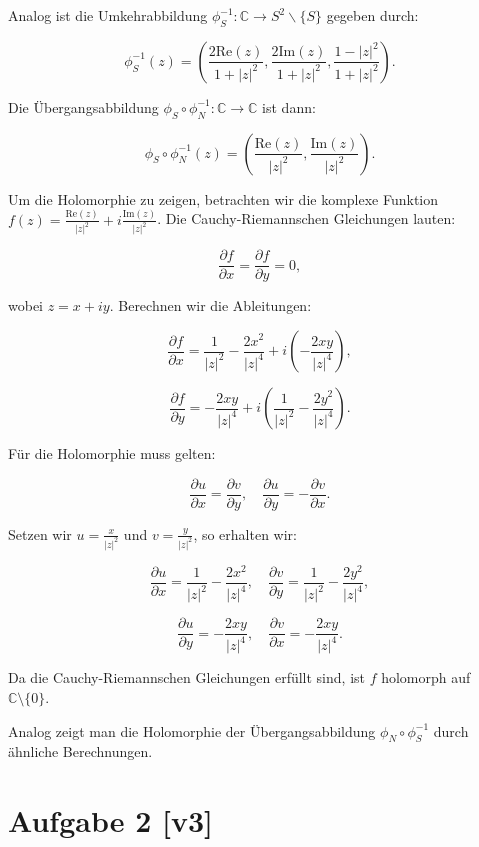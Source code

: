 \documentclass[11pt,a4paper]{article}
\begin{document}
Analog ist die Umkehrabbildung $\phi_S^{-1}: \mathbb{C} \to S^2 \backslash \{S\}$ gegeben durch:

\[
\phi_S^{-1}(z) = \left( \frac{2\text{Re}(z)}{1 + |z|^2}, \frac{2\text{Im}(z)}{1 + |z|^2}, \frac{1 - |z|^2}{1 + |z|^2} \right).
\]

Die Übergangsabbildung $\phi_S \circ \phi_N^{-1}: \mathbb{C} \to \mathbb{C}$ ist dann:

\[
\phi_S \circ \phi_N^{-1}(z) = \left( \frac{\text{Re}(z)}{|z|^2}, \frac{\text{Im}(z)}{|z|^2} \right).
\]

Um die Holomorphie zu zeigen, betrachten wir die komplexe Funktion $f(z) = \frac{\text{Re}(z)}{|z|^2} + i\frac{\text{Im}(z)}{|z|^2}$. Die Cauchy-Riemannschen Gleichungen lauten:

\[
\frac{\partial f}{\partial x} = \frac{\partial f}{\partial y} = 0,
\]

wobei $z = x + iy$. Berechnen wir die Ableitungen:

\[
\frac{\partial f}{\partial x} = \frac{1}{|z|^2} - \frac{2x^2}{|z|^4} + i\left(-\frac{2xy}{|z|^4}\right),
\]

\[
\frac{\partial f}{\partial y} = -\frac{2xy}{|z|^4} + i\left(\frac{1}{|z|^2} - \frac{2y^2}{|z|^4}\right).
\]

Für die Holomorphie muss gelten:

\[
\frac{\partial u}{\partial x} = \frac{\partial v}{\partial y}, \quad \frac{\partial u}{\partial y} = -\frac{\partial v}{\partial x}.
\]

Setzen wir $u = \frac{x}{|z|^2}$ und $v = \frac{y}{|z|^2}$, so erhalten wir:

\[
\frac{\partial u}{\partial x} = \frac{1}{|z|^2} - \frac{2x^2}{|z|^4}, \quad \frac{\partial v}{\partial y} = \frac{1}{|z|^2} - \frac{2y^2}{|z|^4},
\]

\[
\frac{\partial u}{\partial y} = -\frac{2xy}{|z|^4}, \quad \frac{\partial v}{\partial x} = -\frac{2xy}{|z|^4}.
\]

Da die Cauchy-Riemannschen Gleichungen erfüllt sind, ist $f$ holomorph auf $\mathbb{C} \setminus \{0\}$.

Analog zeigt man die Holomorphie der Übergangsabbildung $\phi_N \circ \phi_S^{-1}$ durch ähnliche Berechnungen.


\section*{Aufgabe 2 [v3]}
\end{document}
